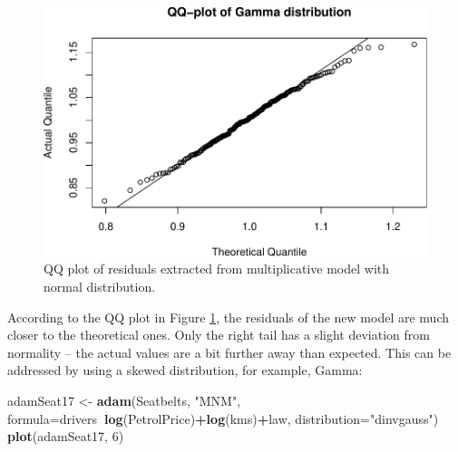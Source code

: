 \documentclass[]{book}
\newenvironment{Shaded}{\begin{snugshade}}{\end{snugshade}}
\newcommand{\DataTypeTok}[1]{\textcolor[rgb]{0.13,0.29,0.53}{#1}}
\newcommand{\DecValTok}[1]{\textcolor[rgb]{0.00,0.00,0.81}{#1}}
\newcommand{\KeywordTok}[1]{\textcolor[rgb]{0.13,0.29,0.53}{\textbf{#1}}}
\newcommand{\NormalTok}[1]{#1}
\newcommand{\OperatorTok}[1]{\textcolor[rgb]{0.81,0.36,0.00}{\textbf{#1}}}
\newcommand{\StringTok}[1]{\textcolor[rgb]{0.31,0.60,0.02}{#1}}
\theoremstyle{definition}
\theoremstyle{definition}
\theoremstyle{definition}
\theoremstyle{definition}
\theoremstyle{remark}
\begin{document}
\begin{figure}
\centering
\includegraphics{Svetunkov--2022----ADAM_files/figure-latex/adamSeat16QQ-1.pdf}
\caption{\label{fig:adamSeat16QQ}QQ plot of residuals extracted from multiplicative model with normal distribution.}
\end{figure}

According to the QQ plot in Figure \ref{fig:adamSeat16QQ}, the residuals of the new model are much closer to the theoretical ones. Only the right tail has a slight deviation from normality -- the actual values are a bit further away than expected. This can be addressed by using a skewed distribution, for example, Gamma:

\begin{Shaded}
\begin{Highlighting}[]
\NormalTok{adamSeat17 <-}\StringTok{ }\KeywordTok{adam}\NormalTok{(Seatbelts, }\StringTok{"MNM"}\NormalTok{,}
                   \DataTypeTok{formula=}\NormalTok{drivers}\OperatorTok{~}\KeywordTok{log}\NormalTok{(PetrolPrice)}\OperatorTok{+}\KeywordTok{log}\NormalTok{(kms)}\OperatorTok{+}\NormalTok{law,}
                   \DataTypeTok{distribution=}\StringTok{"dinvgauss"}\NormalTok{)}
\KeywordTok{plot}\NormalTok{(adamSeat17, }\DecValTok{6}\NormalTok{)}
\end{Highlighting}
\end{Shaded}
\end{document}

